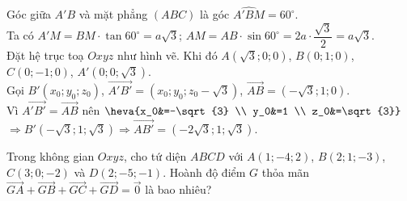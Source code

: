 \begin{bt}
{\begin{center}
		\end{center}
		Góc giữa $A'B$ và mặt phẳng $\left(ABC\right)$  là góc $\widehat{A'BM}=60^{\circ}$.\\
		Ta  có $A'M=BM\cdot \tan 60^{\circ}=a\sqrt{3}$; $AM=AB\cdot \sin 60^{\circ}=2a\cdot \dfrac{\sqrt{3}}{2}=a\sqrt{3}$.\\
		Đặt hệ trục toạ $Oxyz$ như hình  vẽ. Khi đó $A\left(\sqrt{3};0;0\right)$, $B\left(0;1;0\right)$, $C\left(0;-1;0\right)$,
		$A'\left(0;0;\sqrt{3} \right)$.  \\
		Gọi $B'\left(x_0;y_0;z_0  \right)$, $\overrightarrow{A'B'}=\left(x_0;y_0;z_0-\sqrt{3} \right)$, $\overrightarrow{AB}=\left(-\sqrt{3};1;0\right)$.\\
		Vì $\overrightarrow{A'B'}=\overrightarrow{AB}$ nên  $\heva{x_0&=-\sqrt{3} \\ y_0&=1 \\ z_0&=\sqrt{3}} $ $\Rightarrow B'\left(-\sqrt{3};1;\sqrt{3} \right)\Rightarrow \overrightarrow{AB'}=\left(-2\sqrt{3};1;\sqrt{3} \right)$.
	} 
\end{bt}

\begin{bt}%
	Trong không gian $Oxyz$, cho tứ diện $ABCD$ với $A(1;-4;2)$, $B(2;1;-3)$, $C(3;0;-2)$ và $D(2;-5;-1)$. Hoành độ điểm $G$ thỏa mãn $\overrightarrow{GA}+\overrightarrow{GB}+\overrightarrow{GC}+\overrightarrow{GD}=\overrightarrow{0}$ là  bao nhiêu?
\end{bt}

